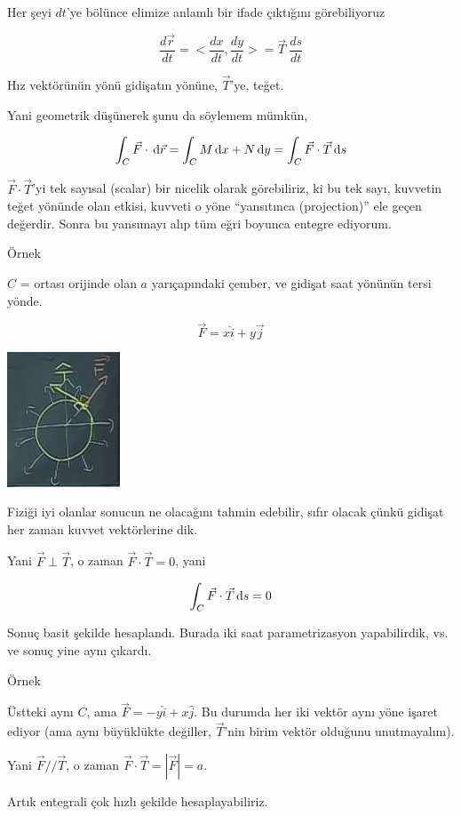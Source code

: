 \documentclass[12pt,fleqn]{article}\usepackage{../../common}
\begin{document}
Her şeyi $dt$'ye bölünce elimize anlamlı bir ifade çıktığını görebiliyoruz

$$ \frac{d\vec{r}}{dt} = <\frac{dx}{dt}, \frac{dy}{dt}> 
= \vec{T} \ \frac{ds}{dt} 
$$

Hız vektörünün yönü gidişatın yönüne, $\vec{T}$'ye, teğet.

Yani geometrik düşünerek şunu da söylemem mümkün,

$$
\int_C \vec{F} \cdot \,\mathrm{d}\vec{r}  = \int_C M \,\mathrm{d} x + N \,\mathrm{d} y
= \int_C \vec{F} \cdot \vec{T} \,\mathrm{d} s
$$

$\vec{F} \cdot \vec{T}$'yi tek sayısal (scalar) bir nicelik olarak görebiliriz,
ki bu tek sayı, kuvvetin teğet yönünde olan etkisi, kuvveti o yöne ``yansıtınca
(projection)'' ele geçen değerdir. Sonra bu yansımayı alıp tüm eğri boyunca
entegre ediyorum.

Örnek

$C$ = ortası orijinde olan $a$ yarıçapındaki çember, ve gidişat saat
yönünün tersi yönde.

$$ \vec{F} = x\hat{i} + y\vec{j} $$

\includegraphics[height=4cm]{19_13.png}

Fiziği iyi olanlar sonucun ne olacağını tahmin edebilir, sıfır olacak çünkü
gidişat her zaman kuvvet vektörlerine dik. 

Yani $\vec{F} \perp \vec{T}$, o zaman $\vec{F} \cdot \vec{T} = 0$, yani

$$  \int_C \vec{F} \cdot \vec{T} \,\mathrm{d} s = 0$$

Sonuç basit şekilde hesaplandı. Burada iki saat parametrizasyon
yapabilirdik, vs. ve sonuç yine aynı çıkardı. 

Örnek

Üstteki aynı $C$, ama $\vec{F} = -y\hat{i} + x\hat{j}$. Bu durumda her iki
vektör aynı yöne işaret ediyor (ama aynı büyüklükte değiller, $\vec{T}$'nin
birim vektör olduğunu unutmayalım).

Yani $\vec{F} // \vec{T}$, o zaman $\vec{F} \cdot \vec{T} = |\vec{F}| =
a$.

Artık entegrali çok hızlı şekilde hesaplayabiliriz. 
\end{document}

